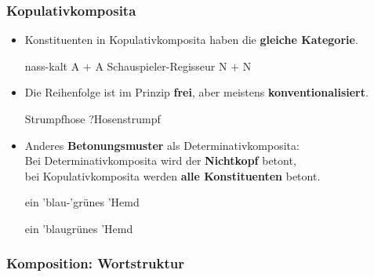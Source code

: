 \begin{frame}
\frametitle{Kopulativkomposita}

\begin{itemize}
	\item Konstituenten in Kopulativkomposita haben die \textbf{gleiche Kategorie}.
	
	\ea 
		\ea nass-kalt \ras A $+$ A
		\ex Schauspieler-Regisseur \ras N $+$ N
		\z 
	\z 
	
	\item Die Reihenfolge ist im Prinzip \textbf{frei}, aber meistens \textbf{konventionalisiert}.
	
	\ea Strumpfhose \vs ?Hosenstrumpf
	\z 
	
	\item Anderes \textbf{Betonungsmuster} als Determinativkomposita: \\
	Bei Determinativkomposita wird der \textbf{Nichtkopf} betont, \\
	bei Kopulativkomposita werden \textbf{alle Konstituenten} betont.
	
	\settowidth{} 
	\ea 
		\ea ein 'blau-'grünes 'Hemd  \jambox{[Kopulativkompositum]}
	
		\ex ein 'blaugrünes 'Hemd \jambox{[Determinativkompositum]}
		\z 
	\z
		 

\end{itemize}


\end{frame}


\subsubsection{Komposition: Wortstruktur}


